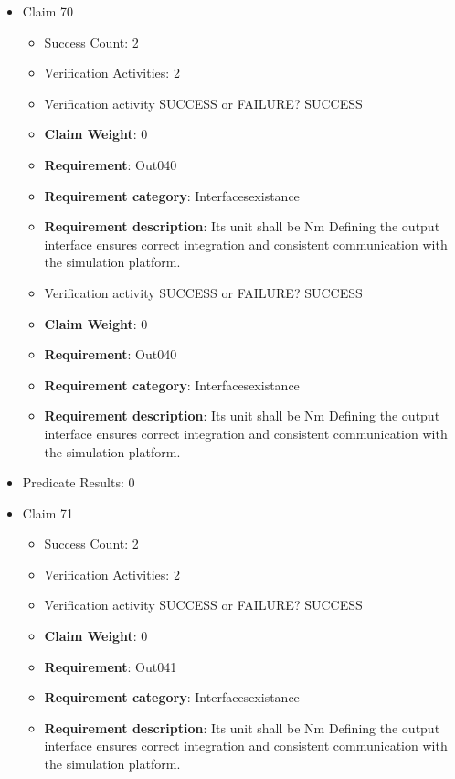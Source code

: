 \documentclass{article}
\begin{document}
\begin{itemize}
  				  \item Claim 70
				\begin{itemize}
			    	\item Success Count: 2 
			    	\item Verification Activities: 2
					\item Verification activity SUCCESS or FAILURE? SUCCESS
					\item \textbf{Claim Weight}: 0
						\item \textbf{Requirement}: Out040 
						\item \textbf{Requirement category}: Interfacesexistance 
						\item \textbf{Requirement description}: Its unit shall be Nm Defining the output interface ensures correct integration and consistent communication with the simulation platform.
					
					\item Verification activity SUCCESS or FAILURE? SUCCESS
					\item \textbf{Claim Weight}: 0
						\item \textbf{Requirement}: Out040 
						\item \textbf{Requirement category}: Interfacesexistance 
						\item \textbf{Requirement description}: Its unit shall be Nm Defining the output interface ensures correct integration and consistent communication with the simulation platform.
					
				\end{itemize}
				
									    
				\item Predicate Results: 0

  				  \item Claim 71
				\begin{itemize}
			    	\item Success Count: 2 
			    	\item Verification Activities: 2
					\item Verification activity SUCCESS or FAILURE? SUCCESS
					\item \textbf{Claim Weight}: 0
						\item \textbf{Requirement}: Out041 
						\item \textbf{Requirement category}: Interfacesexistance 
						\item \textbf{Requirement description}: Its unit shall be Nm Defining the output interface ensures correct integration and consistent communication with the simulation platform.
					

\end{itemize}
\end{itemize}
\end{document}
